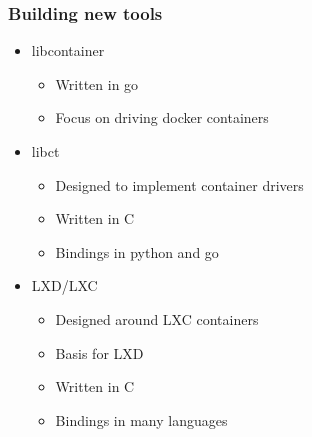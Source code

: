 \documentclass{beamer}
\begin{document}
\begin{frame}
\frametitle{Building new tools}
\begin{itemize}
\item libcontainer
  \begin{itemize}
  \item Written in go
  \item Focus on driving docker containers
  \end{itemize}
\item libct
  \begin{itemize}
  \item Designed to implement container drivers
  \item Written in C
  \item Bindings in python and go
  \end{itemize}
\item LXD/LXC
  \begin{itemize}
  \item Designed around LXC containers
  \item Basis for LXD
  \item Written in C
  \item Bindings in many languages
  \end{itemize}
\end{itemize}
\end{frame}


\end{document}
